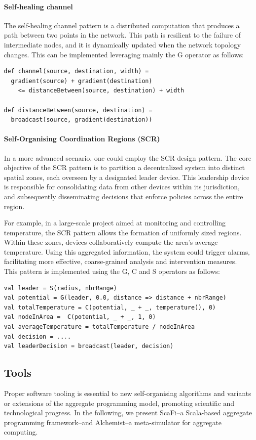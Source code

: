 \paragraph*{Self-healing channel}
The self-healing channel pattern is a distributed computation that produces a path between two points in the network. 
 This path is resilient to the failure of intermediate nodes, 
 and it is dynamically updated when the network topology changes.
%
This can be implemented leveraging mainly the G operator as follows:
\begin{lstlisting}[language=scafi]
def channel(source, destination, width) =
  gradient(source) + gradient(destination) 
    <= distanceBetween(source, destination) + width

def distanceBetween(source, destination) =
  broadcast(source, gradient(destination))

\end{lstlisting}
\paragraph*{Self-Organising Coordination Regions (SCR)}
In a more advanced scenario, 
 one could employ the SCR design pattern. 
 The core objective of the SCR pattern is to partition a decentralized system into distinct spatial zones, each overseen by a designated leader device. 
 This leadership device is responsible for consolidating data from other devices within its jurisdiction,
 and subsequently disseminating decisions that enforce policies across the entire region.

For example, 
 in a large-scale project aimed at monitoring and controlling temperature, 
 the SCR pattern allows the formation of uniformly sized regions. 
 Within these zones, devices collaboratively compute the area's average temperature. 
 Using this aggregated information, the system could trigger alarms, facilitating more effective, coarse-grained analysis and intervention measures.
%
This pattern is implemented using the G, C and S operators as follows:
\begin{lstlisting}[language=scafi]
val leader = S(radius, nbrRange) 
val potential = G(leader, 0.0, distance => distance + nbrRange)
val totalTemperature = C(potential, _ + _, temperature(), 0)
val nodeInArea =  C(potential, _ + _, 1, 0)
val averageTemperature = totalTemperature / nodeInArea
val decision = ....
val leaderDecision = broadcast(leader, decision)
\end{lstlisting}
\subsection{Tools}
Proper software tooling
is essential to new self-organising algorithms
and variants or extensions of the aggregate programming model,
promoting scientific and technological progress.
In the following, we present ScaFi--a Scala-based aggregate programming framework--and Alchemist--a meta-simulator for aggregate computing.
